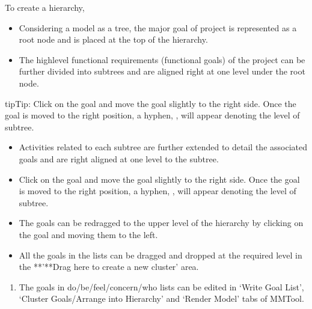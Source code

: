 \documentclass[letterpaper,10pt,english]{jupyterBook}
\begin{document}
\sphinxAtStartPar
To create a hierarchy,
\begin{itemize}
\item {} 
\sphinxAtStartPar
Considering a model as a tree, the major goal of project is
represented as a root node and is placed at the top of the
hierarchy.

\item {} 
\sphinxAtStartPar
The high\sphinxhyphen{}level functional requirements (functional goals) of the
project can be further divided into subtrees and are aligned right
at one level under the root node.

\end{itemize}

\begin{sphinxadmonition}{tip}{Tip:}
\sphinxAtStartPar
Click on the goal and move the goal slightly to the right side. Once
the goal is moved to the right position, a hyphen, \sphinxhyphen{}, will appear
denoting the level of subtree.
\end{sphinxadmonition}

\sphinxAtStartPar
{}
\begin{itemize}
\item {} 
\sphinxAtStartPar
Activities related to each subtree are further extended to detail
the associated goals and are right aligned at one level to the
subtree.

\item {} 
\sphinxAtStartPar
Click on the goal and move the goal slightly to the right side. Once
the goal is moved to the right position, a hyphen, \sphinxhyphen{}, will appear
denoting the level of subtree.

\item {} 
\sphinxAtStartPar
The goals can be re\sphinxhyphen{}dragged to the upper level of the hierarchy by
clicking on the goal and moving them to the left.

\item {} 
\sphinxAtStartPar
All the goals in the lists can be dragged and dropped at the
required level in the **’**Drag here to create a new cluster’ area.

\end{itemize}

\sphinxAtStartPar
{}
\begin{enumerate}
%
\item {} 
\sphinxAtStartPar
The goals in do/be/feel/concern/who lists can be edited in ‘Write
Goal List’, ‘Cluster Goals/Arrange into Hierarchy’ and ‘Render
Model’ tabs of MMTool.

\end{enumerate}
\end{document}
